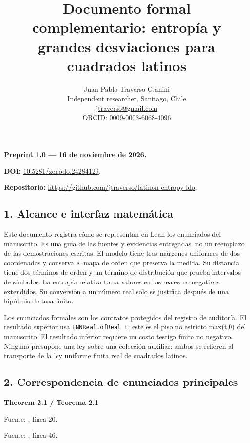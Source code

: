 \documentclass[spanish,11pt,a4paper]{article}
\title{Documento formal complementario: entropía y grandes desviaciones para cuadrados latinos}
\author{Juan Pablo Traverso Gianini\\\small Independent researcher, Santiago, Chile\\\small \href{mailto:jtraverso@gmail.com}{jtraverso@gmail.com}\\\small \href{https://orcid.org/0009-0003-6068-4096}{ORCID: 0009-0003-6068-4096}}
\date{}
\begin{document}
\raggedbottom\maketitle
\textbf{Preprint 1.0 --- 16 de noviembre de 2026.}

\textbf{DOI:} \href{https://doi.org/10.5281/zenodo.24284129}{10.5281/zenodo.24284129}.

\textbf{Repositorio:} \url{https://github.com/jtraverso/latinon-entropy-ldp}.

\subsection{1. Alcance e interfaz matemática}\label{alcance-e-interfaz-matemuxe1tica}

Este documento registra cómo se representan en Lean los enunciados del manuscrito. Es una guía de las fuentes y evidencias entregadas, no un reemplazo de las demostraciones escritas. El modelo tiene tres márgenes uniformes de dos coordenadas y conserva el mapa de orden que preserva la medida. Su distancia tiene dos términos de orden y un término de distribución que prueba intervalos de símbolos. La entropía relativa toma valores en los reales no negativos extendidos. Su conversión a un número real solo se justifica después de una hipótesis de tasa finita.

Los enunciados formales son los contratos protegidos del registro de auditoría. El resultado superior usa \texttt{ENNReal.ofReal\ t}; este es el piso no estricto max(t,0) del manuscrito. El resultado inferior requiere un costo testigo finito no negativo. Ninguno presupone una ley sobre una colección auxiliar: ambos se refieren al transporte de la ley uniforme finita real de cuadrados latinos.

\subsection{2. Correspondencia de enunciados principales}\label{correspondencia-de-enunciados-principales}

\textbf{Theorem 2.1 / Teorema 2.1}


Fuente: , línea 20.


Fuente: , línea 46.
\end{document}
